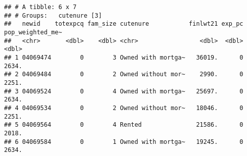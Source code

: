 \documentclass[
]{article}
\newenvironment{Shaded}{\begin{snugshade}}{\end{snugshade}}
\newcommand{\DataTypeTok}[1]{\textcolor[rgb]{0.13,0.29,0.53}{#1}}
\newcommand{\DecValTok}[1]{\textcolor[rgb]{0.00,0.00,0.81}{#1}}
\newcommand{\KeywordTok}[1]{\textcolor[rgb]{0.13,0.29,0.53}{\textbf{#1}}}
\newcommand{\NormalTok}[1]{#1}
\newcommand{\OperatorTok}[1]{\textcolor[rgb]{0.81,0.36,0.00}{\textbf{#1}}}
\newcommand{\StringTok}[1]{\textcolor[rgb]{0.31,0.60,0.02}{#1}}
\begin{document}
\begin{Shaded}
\end{Shaded}

\begin{verbatim}
## # A tibble: 6 x 7
## # Groups:   cutenure [3]
##   newid    totexpcq fam_size cutenure           finlwt21 exp_pc pop_weighted_me~
##   <chr>       <dbl>    <dbl> <chr>                 <dbl>  <dbl>            <dbl>
## 1 04069474        0        3 Owned with mortga~   36019.      0            2634.
## 2 04069484        0        2 Owned without mor~    2990.      0            2251.
## 3 04069524        0        4 Owned with mortga~   25697.      0            2634.
## 4 04069534        0        2 Owned without mor~   18046.      0            2251.
## 5 04069564        0        4 Rented               21586.      0            2018.
## 6 04069584        0        1 Owned with mortga~   19245.      0            2634.
\end{verbatim}
\end{document}
